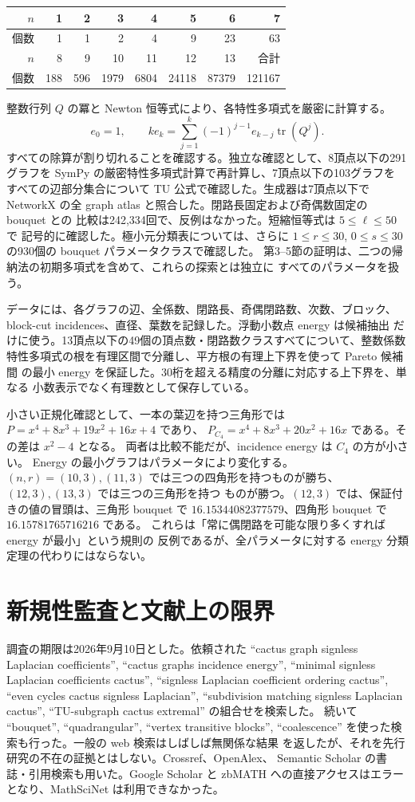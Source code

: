 \documentclass[12pt]{amsart}
\theoremstyle{definition}
\theoremstyle{remark}
\numberwithin{equation}{section}
\DeclareMathOperator{\tr}{tr}
\begin{document}
\begin{center}
\begin{tabular}{r|rrrrrrr}
$n$&1&2&3&4&5&6&7\\\hline
個数&1&1&2&4&9&23&63\\[3pt]
$n$&8&9&10&11&12&13&合計\\\hline
個数&188&596&1979&6804&24118&87379&121167
\end{tabular}
\end{center}

整数行列 $Q$ の冪と Newton 恒等式により、各特性多項式を厳密に計算する。
\[
 e_0=1,\qquad
 k e_k=\sum_{j=1}^k(-1)^{j-1}e_{k-j}\tr(Q^j).
\]
すべての除算が割り切れることを確認する。独立な確認として、8頂点以下の291
グラフを SymPy の厳密特性多項式計算で再計算し、7頂点以下の103グラフを
すべての辺部分集合について TU 公式で確認した。生成器は7頂点以下で NetworkX
の全 graph atlas と照合した。閉路長固定および奇偶数固定の bouquet との
比較は242,334回で、反例はなかった。短縮恒等式は $5\le\ell\le50$ で
記号的に確認した。極小元分類表については、さらに
$1\le r\le30$, $0\le s\le30$ の930個の bouquet パラメータクラスで確認した。
第3--5節の証明は、二つの帰納法の初期多項式を含めて、これらの探索とは独立に
すべてのパラメータを扱う。

データには、各グラフの辺、全係数、閉路長、奇偶閉路数、次数、ブロック、
block-cut incidences、直径、葉数を記録した。浮動小数点 energy は候補抽出
だけに使う。13頂点以下の49個の頂点数・閉路数クラスすべてについて、整数係数
特性多項式の根を有理区間で分離し、平方根の有理上下界を使って Pareto 候補間
の最小 energy を保証した。30桁を超える精度の分離に対応する上下界を、単なる
小数表示でなく有理数として保存している。

小さい正規化確認として、一本の葉辺を持つ三角形では
$P=x^4+8x^3+19x^2+16x+4$ であり、
$P_{C_4}=x^4+8x^3+20x^2+16x$ である。その差は $x^2-4$ となる。
両者は比較不能だが、incidence energy は $C_4$ の方が小さい。
Energy の最小グラフはパラメータにより変化する。$(n,r)=(10,3),(11,3)$
では三つの四角形を持つものが勝ち、$(12,3),(13,3)$ では三つの三角形を持つ
ものが勝つ。$(12,3)$ では、保証付きの値の冒頭は、三角形 bouquet で
$16.15344082377579$、四角形 bouquet で $16.15781765716216$ である。
これらは「常に偶閉路を可能な限り多くすれば energy が最小」という規則の
反例であるが、全パラメータに対する energy 分類定理の代わりにはならない。

\section{新規性監査と文献上の限界}
調査の期限は2026年9月10日とした。依頼された
``cactus graph signless Laplacian coefficients'',
``cactus graphs incidence energy'',
``minimal signless Laplacian coefficients cactus'',
``signless Laplacian coefficient ordering cactus'',
``even cycles cactus signless Laplacian'',
``subdivision matching signless Laplacian cactus'',
``TU-subgraph cactus extremal'' の組合せを検索した。
続いて ``bouquet'', ``quadrangular'', ``vertex transitive blocks'',
``coalescence'' を使った検索も行った。一般の web 検索はしばしば無関係な結果
を返したが、それを先行研究の不在の証拠とはしない。Crossref、OpenAlex、
Semantic Scholar の書誌・引用検索も用いた。Google Scholar と zbMATH
への直接アクセスはエラーとなり、MathSciNet は利用できなかった。
\end{document}
